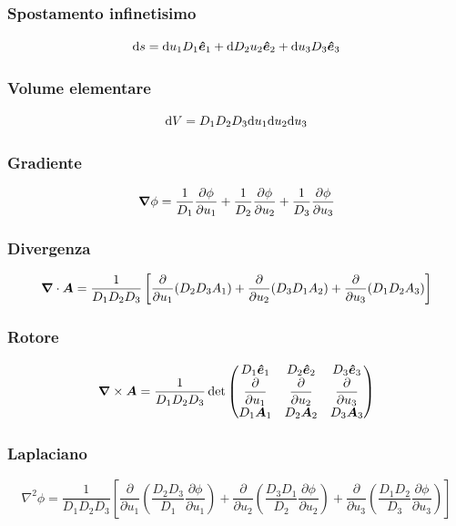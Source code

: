 \subsubsection{Spostamento infinetisimo}
\begin{equation}
  \mathrm{d} s = \mathrm{d} u_1 D_1 \boldsymbol{\hat {e}}_1 + \mathrm{d} D_2 u_2\boldsymbol{\hat {e}}_2 + \mathrm{d} u_3 D_3 \boldsymbol{\hat {e}}_3
\end{equation}
\subsubsection{Volume elementare}
\begin{equation}
  \mathrm{d} V = D_1D_2D_3 \mathrm{d} u_1\mathrm{d} u_2\mathrm{d} u_3
\end{equation}
\subsubsection{Gradiente}
\begin{equation}
  \boldsymbol{\nabla}\phi = \frac{1}{D_1}\frac{\partial\phi}{\partial u_1} + \frac{1}{D_2}\frac{\partial\phi}{\partial u_2} + \frac{1}{D_3}\frac{\partial\phi}{\partial u_3}
\end{equation}
\subsubsection{Divergenza}
\begin{equation}
  \boldsymbol{\nabla}\cdot\boldsymbol{A} = \frac{1}{D_1D_2D_3}\left[\frac{\partial}{\partial u_1}(D_2D_3 A_1) + \frac{\partial}{\partial u_2}(D_3D_1 A_2) + \frac{\partial}{\partial u_3}(D_1D_2 A_3)\right]
\end{equation}
\subsubsection{Rotore}
\begin{equation}
  \boldsymbol{\nabla}\times\boldsymbol{A} = \frac{1}{D_1D_2D_3}\det\begin{pmatrix}
    D_1\boldsymbol{\hat {e}}_1                    & D_2\boldsymbol{\hat {e}}_2                    & D_3\boldsymbol{\hat {e}}_3                    \\
    \dfrac{\partial}{\partial u_1} & \dfrac{\partial}{\partial u_2} & \dfrac{\partial}{\partial u_3} \\
    D_1\boldsymbol{A}_1                     & D_2\boldsymbol{A}_2                     & D_3\boldsymbol{A}_3\end{pmatrix}
\end{equation}
\subsubsection{Laplaciano}
\begin{equation}
  \nabla^2 \phi = \frac{1}{D_1D_2D_3}\left[
    \frac{\partial}{\partial u_1}\left(\frac{D_2D_3}{D_1}\frac{\partial\phi}{\partial u_1}\right)
    + \frac{\partial}{\partial u_2}\left(\frac{D_3D_1}{D_2}\frac{\partial\phi}{\partial u_2}\right)
    + \frac{\partial}{\partial u_3}\left(\frac{D_1D_2}{D_3}\frac{\partial\phi}{\partial u_3}\right)
    \right]
\end{equation}

